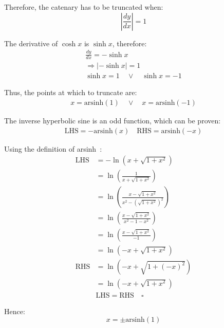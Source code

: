 \documentclass[12pt]{article}
\begin{document}
        Therefore, the catenary has to be truncated when:
        \begin{equation}
            | \frac{dy}{dx} | = 1
        \end{equation}

        The derivative of $\cosh x$ is $\sinh x$, therefore:
        \begin{align}
            \frac{dy}{dx} = - \sinh x \\
            \Rightarrow | - \sinh x | = 1 \\
            \sinh x = 1 \quad\lor\quad \sinh x = -1
        \end{align}

        Thus, the points at which to truncate are:
        \begin{align}\label{eq:x_cosh_end}
            x = \text{arsinh}(1) \quad\lor\quad x = \text{arsinh}(-1)
        \end{align}

        The inverse hyperbolic sine is an odd function, which can be proven:
        \begin{align}
            \text{LHS} = -\text{arsinh}(x) \quad \text{RHS} = \text{arsinh}(-x)
        \end{align}

        Using the definition of arsinh~\cite{oxford_dict}:
        \begin{align}
            \text{LHS} &= - \ln(x+\sqrt{1+x^2}) \\
            &= \ln(\frac{1}{x+\sqrt{1+x^2}}) \\
            &= \ln(\frac{x-\sqrt{1+x^2}}{x^2-(\sqrt{1+x^2})^2}) \\
            &= \ln(\frac{x-\sqrt{1+x^2}}{x^2-1-x^2}) \\
            &= \ln(\frac{x-\sqrt{1+x^2}}{-1}) \\ 
            &= \ln(-x+\sqrt{1+x^2}) \\ 
            \text{RHS} &= \ln(-x+\sqrt{1+(-x)^2}) \\
            &= \ln(-x+\sqrt{1+x^2}) \\
            &\text{LHS} = \text{RHS} \quad \square
        \end{align}

        Hence:
        \begin{equation}
            x = \pm \text{arsinh}(1)
        \end{equation} 
\end{document}
